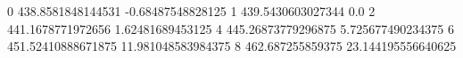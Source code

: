 0 438.8581848144531 -0.68487548828125
1 439.5430603027344 0.0
2 441.1678771972656 1.62481689453125
4 445.26873779296875 5.725677490234375
6 451.52410888671875 11.981048583984375
8 462.687255859375 23.144195556640625
